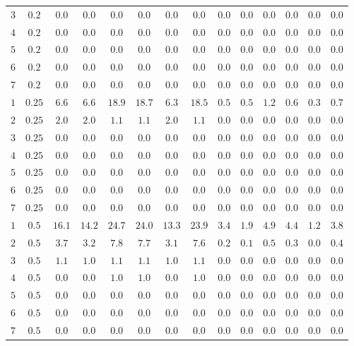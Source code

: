 \begin{tabular}{cccccccccccccc}
$3$ & $0.2$ & $0.0$ & $0.0$ & $0.0$ & $0.0$ & $0.0$ & $0.0$ & $0.0$ & $0.0$ & $0.0$ & $0.0$ & $0.0$ & $0.0$\\
$4$ & $0.2$ & $0.0$ & $0.0$ & $0.0$ & $0.0$ & $0.0$ & $0.0$ & $0.0$ & $0.0$ & $0.0$ & $0.0$ & $0.0$ & $0.0$\\
$5$ & $0.2$ & $0.0$ & $0.0$ & $0.0$ & $0.0$ & $0.0$ & $0.0$ & $0.0$ & $0.0$ & $0.0$ & $0.0$ & $0.0$ & $0.0$\\
$6$ & $0.2$ & $0.0$ & $0.0$ & $0.0$ & $0.0$ & $0.0$ & $0.0$ & $0.0$ & $0.0$ & $0.0$ & $0.0$ & $0.0$ & $0.0$\\
$7$ & $0.2$ & $0.0$ & $0.0$ & $0.0$ & $0.0$ & $0.0$ & $0.0$ & $0.0$ & $0.0$ & $0.0$ & $0.0$ & $0.0$ & $0.0$\\
$1$ & $0.25$ & $6.6$ & $6.6$ & $18.9$ & $18.7$ & $6.3$ & $18.5$ & $0.5$ & $0.5$ & $1.2$ & $0.6$ & $0.3$ & $0.7$\\
$2$ & $0.25$ & $2.0$ & $2.0$ & $1.1$ & $1.1$ & $2.0$ & $1.1$ & $0.0$ & $0.0$ & $0.0$ & $0.0$ & $0.0$ & $0.0$\\
$3$ & $0.25$ & $0.0$ & $0.0$ & $0.0$ & $0.0$ & $0.0$ & $0.0$ & $0.0$ & $0.0$ & $0.0$ & $0.0$ & $0.0$ & $0.0$\\
$4$ & $0.25$ & $0.0$ & $0.0$ & $0.0$ & $0.0$ & $0.0$ & $0.0$ & $0.0$ & $0.0$ & $0.0$ & $0.0$ & $0.0$ & $0.0$\\
$5$ & $0.25$ & $0.0$ & $0.0$ & $0.0$ & $0.0$ & $0.0$ & $0.0$ & $0.0$ & $0.0$ & $0.0$ & $0.0$ & $0.0$ & $0.0$\\
$6$ & $0.25$ & $0.0$ & $0.0$ & $0.0$ & $0.0$ & $0.0$ & $0.0$ & $0.0$ & $0.0$ & $0.0$ & $0.0$ & $0.0$ & $0.0$\\
$7$ & $0.25$ & $0.0$ & $0.0$ & $0.0$ & $0.0$ & $0.0$ & $0.0$ & $0.0$ & $0.0$ & $0.0$ & $0.0$ & $0.0$ & $0.0$\\
$1$ & $0.5$ & $16.1$ & $14.2$ & $24.7$ & $24.0$ & $13.3$ & $23.9$ & $3.4$ & $1.9$ & $4.9$ & $4.4$ & $1.2$ & $3.8$\\
$2$ & $0.5$ & $3.7$ & $3.2$ & $7.8$ & $7.7$ & $3.1$ & $7.6$ & $0.2$ & $0.1$ & $0.5$ & $0.3$ & $0.0$ & $0.4$\\
$3$ & $0.5$ & $1.1$ & $1.0$ & $1.1$ & $1.1$ & $1.0$ & $1.1$ & $0.0$ & $0.0$ & $0.0$ & $0.0$ & $0.0$ & $0.0$\\
$4$ & $0.5$ & $0.0$ & $0.0$ & $1.0$ & $1.0$ & $0.0$ & $1.0$ & $0.0$ & $0.0$ & $0.0$ & $0.0$ & $0.0$ & $0.0$\\
$5$ & $0.5$ & $0.0$ & $0.0$ & $0.0$ & $0.0$ & $0.0$ & $0.0$ & $0.0$ & $0.0$ & $0.0$ & $0.0$ & $0.0$ & $0.0$\\
$6$ & $0.5$ & $0.0$ & $0.0$ & $0.0$ & $0.0$ & $0.0$ & $0.0$ & $0.0$ & $0.0$ & $0.0$ & $0.0$ & $0.0$ & $0.0$\\
$7$ & $0.5$ & $0.0$ & $0.0$ & $0.0$ & $0.0$ & $0.0$ & $0.0$ & $0.0$ & $0.0$ & $0.0$ & $0.0$ & $0.0$ & $0.0$\\
\end{tabular}
